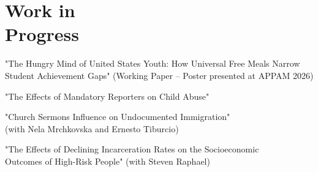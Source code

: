 \section{\sc Work in \\ Progress}

"The Hungry Mind of United States Youth:
How Universal Free Meals Narrow Student Achievement Gaps" (Working Paper -- Poster presented at APPAM 2026) 

"The Effects of Mandatory Reporters on Child Abuse"

"Church Sermons Influence on Undocumented Immigration" \\ 
(with Nela Mrchkovska and Ernesto Tiburcio)

"The Effects of Declining Incarceration Rates on
the Socioeconomic \\ Outcomes of High-Risk People" (with Steven Raphael)



\endinput
